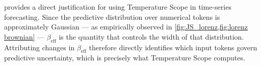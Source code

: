 \documentclass{article}
\begin{document}
\noindent
{} provides a direct justification for using Temperature Scope in time-series forecasting.
Since the predictive distribution over numerical tokens is approximately Gaussian --- as empirically observed in \cref{fig:JS_lorenz,fig:lorenz brownian} --- $\beta_\mathrm{eff}$ is the quantity that controls the width of that distribution.
Attributing changes in $\beta_\mathrm{eff}$ therefore directly identifies which input tokens govern predictive uncertainty, which is precisely what Temperature Scope computes.



\end{document}
